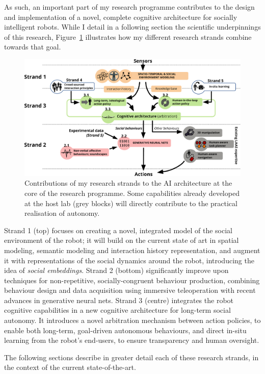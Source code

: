As such, an important part of my research programme contributes to the design
and implementation of a novel, complete cognitive architecture for socially
intelligent robots. While I detail in a following section the scientific
underpinnings of this research, Figure~\ref{fig:archi} illustrates how my
different research strands combine towards that goal.

\begin{figure}[h!]
\centering
\includegraphics[width=\linewidth]{figs/archi}
\caption{Contributions of my research strands to the AI architecture at the core
    of the research programme. Some capabilities already developed at the host
    lab (grey blocks) will directly contribute to the practical realisation of autonomy.}
\label{fig:archi}
\end{figure}


Strand 1 (top) focuses on creating a novel, integrated model of the social
environment of the robot; it will build on the current state of art in spatial
modeling, semantic modeling and interaction history representation, and augment
it with representations of the social dynamics around the robot, introducing the
idea of \emph{social embeddings}. Strand 2 (bottom) significantly improve upon
techniques for non-repetitive, socially-congruent behaviour production,
combining behaviour design and data acquisition using immersive teleoperation
with recent advances in generative neural nets. Strand 3 (centre) integrates the
robot cognitive capabilities in a new cognitive architecture for long-term
social autonomy. It introduces a novel arbitration mechanism between action
policies, to enable both long-term, goal-driven autonomous behaviours, and
direct in-situ learning from the robot's end-users, to ensure transparency and
human oversight.


The following sections describe in greater detail each of these research
strands, in the context of the current state-of-the-art.

